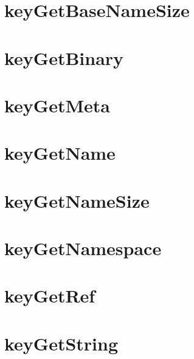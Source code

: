 \documentclass[twoside]{book}
\newcommand{\+}{\discretionary{\mbox{\scriptsize$\hookleftarrow$}}{}{}}
\begin{document}
\chapter{key\+Get\+Base\+Name\+Size}
\label{doc_api_review_core_keyGetBaseNameSize_md}

\chapter{key\+Get\+Binary}
\label{doc_api_review_core_keyGetBinary_md}

\chapter{key\+Get\+Meta}
\label{doc_api_review_core_keyGetMeta_md}

\chapter{key\+Get\+Name}
\label{doc_api_review_core_keyGetName_md}

\chapter{key\+Get\+Name\+Size}
\label{doc_api_review_core_keyGetNameSize_md}

\chapter{key\+Get\+Namespace}
\label{doc_api_review_core_keyGetNamespace_md}

\chapter{key\+Get\+Ref}
\label{doc_api_review_core_keyGetRef_md}

\chapter{key\+Get\+String}
\label{doc_api_review_core_keyGetString_md}

\end{document}
